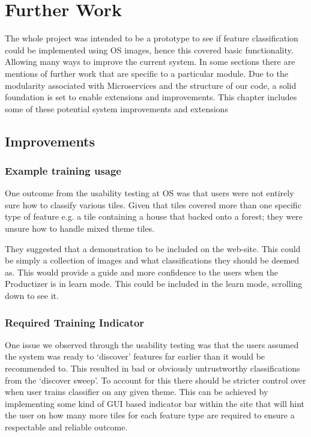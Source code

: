 \chapter{Further Work} \label{chapter:further}
The whole project was intended to be a prototype to see if feature classification could be implemented using OS images, hence this covered basic functionality. Allowing many ways to improve the current system. In some sections there are mentions of further work that are specific to a particular module. Due to the modularity associated with Microservices and the structure of our code, a solid foundation is set to enable extensions and improvements. This chapter includes some of these potential system improvements and extensions




\section{Improvements}


\subsection{Example training usage}
One outcome from the usability testing at OS was that users were not entirely sure how to classify various tiles. Given that tiles covered more than one specific type of feature e.g. a tile containing a house that backed onto a forest; they were unsure how to handle mixed theme tiles.

They suggested that a demonstration to be included on the web-site. This could be simply a collection of images and what classifications they should be deemed as. This would provide a guide and more confidence to the users when the Productizer is in learn mode. This could be included in the learn mode, scrolling down to see it. 




\subsection{Required Training Indicator}
One issue we observed through the usability testing was that the users assumed the system was ready to `discover' features far earlier than it would be recommended to. This resulted in bad or obviously untrustworthy classifications from the `discover sweep'. To account for this there should be stricter control over when user trains classifier on any given theme. This can be achieved by implementing some kind of GUI based indicator bar within the site that will hint the user on how many more tiles for each feature type are required to ensure a respectable and reliable outcome. 


